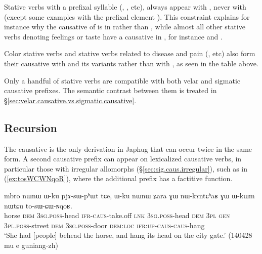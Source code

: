 Stative verbs with a prefixal syllable (, ,  etc), always appear with , never with  (except some examples with the prefixal element ). This constraint explains for instance why the causative of  is  in  rather than , while almost all other stative verbs denoting feelings or taste have a causative in , for instance  \fl{}  and  \fl{} .
  
Color stative verbs and stative verbs related to disease and pain (,  etc) also form their causative with  and its variants rather than with , as seen in the table above.
  
Only a handful of  stative verbs are compatible with both velar and sigmatic causative prefixes. The semantic contrast between them is treated in §\ref{sec:velar.causative.vs.sigmatic.causative}.
    
\subsection{Recursion} \label{sec:sig.caus.other.recursion}
 
The causative is the only derivation in Japhug that can occur twice in the same form. A second causative prefix can appear on lexicalized causative verbs, in particular those with irregular allomorphs (§\ref{sec:sig.caus.irregular}), such as  in (\ref{ex:tosWCWNqoR}), where the additional  prefix has a factitive function. 

\begin{exe}
\ex \label{ex:tosWCWNqoR}
\gll mbro nɯnɯ ɯ-ku pjɤ-sɯ-pʰɯt tɕe, ɯ-ku nɯnɯ ʑara ɣɯ nɯ-kɤntɕʰaʁ ɣɯ ɯ-kɯm nɯtɕu to-sɯ-ɕɯ-ɴqoʁ. \\
horse \textsc{dem} \textsc{3sg}.\textsc{poss}-head \textsc{ifr}-\textsc{caus}-take.off \textsc{lnk} \textsc{3sg}.\textsc{poss}-head \textsc{dem} \textsc{3pl} \textsc{gen} \textsc{3pl}.\textsc{poss}-street \textsc{dem} \textsc{3sg}.\textsc{poss}-door \textsc{dem}:\textsc{loc} \textsc{ifr}:\textsc{up}-\textsc{caus}-\textsc{caus}-hang \\
\glt `She had [people] behead the horse, and hang its head on the city gate.' (140428 mu e guniang-zh)
  \end{exe} 
  
